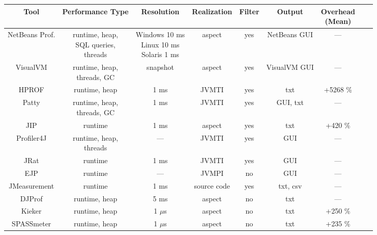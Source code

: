 \begin{table}

    \begin{tabular}{*{9}{c}}
    	\toprule
        Tool & Performance Type & Resolution & Realization & Filter & Output & \makecell{Overhead \\ (Mean)} \\
        \midrule
        NetBeans Prof. & \makecell{runtime, heap, \\ SQL queries, \\ threads} & \makecell{Windows 10 ms \\ Linux 10 ms \\ Solaris 1 ms} & aspect & yes & NetBeans GUI & --- \\
        \midrule
        VisualVM & \makecell{runtime, heap, \\ threads, GC} & snapshot & aspect & yes & VisualVM GUI & --- \\
        \midrule
        HPROF & runtime, heap & 1 ms & JVMTI & yes & txt & +5268 \% \\
        \midrule
        Patty & \makecell{runtime, heap, \\ threads, GC} & 1 ms & JVMTI & yes & GUI, txt & --- \\
        \midrule
        JIP & runtime & 1 ms & aspect & yes & txt & +420 \% \\
        \midrule
        Profiler4J & \makecell{runtime, heap, \\ threads} & --- & JVMTI & yes & GUI & --- \\
        \midrule
        JRat & runtime & 1 ms & JVMTI & yes & GUI & --- \\
        \midrule
        EJP & runtime & --- & JVMPI & no & GUI & --- \\
        \midrule
        JMeasurement & runtime & 1 ms & source code & yes & txt, csv & --- \\
        \midrule
        DJProf & runtime, heap & 5 ms & aspect & no & txt & --- \\
        \midrule
        Kieker & runtime, heap & 1 $\mu$s & aspect & no & txt & +250 \% \\
        \midrule
        SPASSmeter & runtime, heap & 1 $\mu$s & aspect & no & txt & +235 \% \\


        \bottomrule
    \end{tabular}
    \label{java_monitoring_tools}
\end{table}

